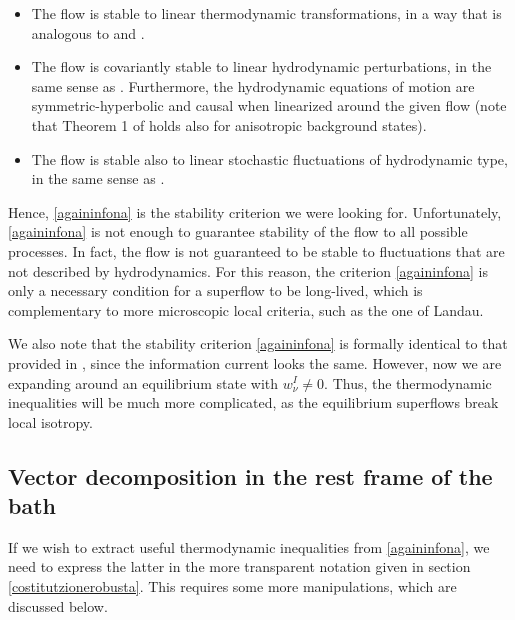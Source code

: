 \documentclass[a4paper, amsfonts, amssymb, amsmath, reprint, showkeys, nofootinbib, twoside,notitlepage,onecolumn]{revtex4-2}
\theoremstyle{definition}
\theoremstyle{theorem}
\theoremstyle{corollary}
\begin{document}
\begin{itemize}
\item[(i)] The flow is stable to linear thermodynamic transformations, in a way that is analogous to \cite[\S 21]{landau5} and \cite[\S 12]{prigoginebook}.
\item[(ii)] The flow is covariantly stable to linear hydrodynamic perturbations, in the same sense as \cite{Hishcock1983,GavassinoBounds2023}. Furthermore, the hydrodynamic equations of motion are symmetric-hyperbolic and causal when linearized around the given flow \cite{GavassinoCausality2021,GavassinoSuperluminal2021,GavassinoUniversalityI2023} (note that Theorem 1 of \cite{GavassinoUniversalityI2023} holds also for anisotropic background states).
\item[(iii)] The flow is stable also to linear stochastic fluctuations of hydrodynamic type, in the same sense as \cite{GavassinoFluctuatingBDNK2024vyu}.
\end{itemize}
Hence, \eqref{againinfona} is the stability criterion we were looking for. Unfortunately, \eqref{againinfona} is not enough to guarantee stability of the flow to all possible processes. In fact, the flow is not guaranteed to be stable to fluctuations that are not described by hydrodynamics. For this reason, the criterion \eqref{againinfona} is only a necessary condition for a superflow to be long-lived, which is complementary to more microscopic local criteria, such as the one of Landau. 

We also note that the stability criterion \eqref{againinfona} is formally identical to that provided in \cite{GavassinoStabilityCarter2022}, since the information current looks the same. However, now we are expanding around an equilibrium state with $w^I_\nu \neq 0$. Thus, the thermodynamic inequalities will be much  more complicated, as the equilibrium superflows break local isotropy.

\vspace{-0.2cm}
\subsection{Vector decomposition in the rest frame of the bath}
\vspace{-0.2cm}

If we wish to extract useful thermodynamic inequalities from \eqref{againinfona}, we need to express the latter in the more transparent notation given in section \ref{costitutzionerobusta}. This requires some more manipulations, which are discussed below.
\end{document}
